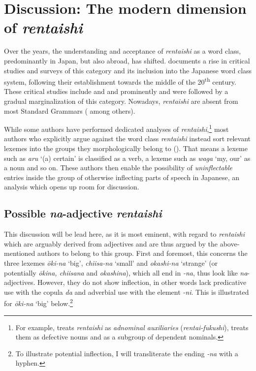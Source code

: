 \documentclass[output=paper,colorlinks,citecolor=brown]{langscibook}
\begin{document}
\section{Discussion: The modern dimension of \emph{rentaishi}} \label{12sec5}

Over the years, the understanding and acceptance of \emph{rentaishi} as a word class, predominantly in Japan, but also abroad, has shifted. \citet[53]{komatsu1973} documents a rise in critical studies and surveys of this category and its inclusion into the Japanese word class system, following their establishment towards the middle of the 20\textsuperscript{th} century. These critical studies include \citet{tokuda1934} and \citet{suzuki1959} and prominently \citet{watanabe1971} and were followed by a gradual marginalization of this category. Nowadays, \emph{rentaishi} are absent from most Standard Grammars (\citealt{hinds1988, tsujimura2014, hasegawa2015} among others).

While some authors have performed dedicated analyses of \emph{rentaishi},\footnote{For example, \citet{watanabe1971} treats \emph{rentaishi} as \emph{adnominal auxiliaries}	(\emph{rentai-fukushi}), \citet[742--753]{martin1975} treats them as defective nouns and \citet[27]{kato2003} as a subgroup of dependent nominals.} most authors who explicitly argue against the word class \emph{rentaishi} instead sort relevant lexemes into the groups they morphologically belong to (\citealt{mio1942, mio1958, suzuki1959, lehmannnishina2015}). That means a lexeme such as \emph{aru} `(a) certain' is classified as a verb, a lexeme such as \emph{waga} `my, our' as a noun and so on. These authors then enable the possibility of \emph{uninflectable} entries inside the group of otherwise inflecting parts of speech in Japanese, an analysis which opens up room for discussion.

\subsection{Possible \emph{na}-adjective \emph{rentaishi}} \label{12sec5.1}

This discussion will be lead here, as it is most eminent, with regard to \emph{rentaishi} which are arguably derived from adjectives and are thus argued by the above-mentioned authors to belong to this group. First and foremost, this concerns the three lexemes \emph{ōki-na} `big',
\emph{chiisa-na} `small' and \emph{okashi-na} `strange' (or potentially \emph{ōkina, chiisana} and \emph{okashina}), which all end in \emph{-na}, thus look like \emph{na}-adjectives. However, they do not show inflection, in other words lack predicative use with the copula \emph{da} and adverbial use with the element \emph{-ni}. This is illustrated for \emph{ōki-na} `big' below.\footnote{To illustrate potential inflection, I will transliterate the ending \emph{-na} with a hyphen.}
\end{document}
